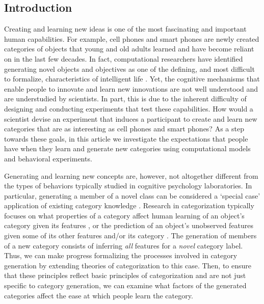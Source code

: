 \documentclass[12pt]{article}
\begin{document}
\begin{flushleft}

\section{Introduction}
\setlength\parindent{0.5in}

Creating and learning new ideas is one of the most fascinating and important
human capabilities. For example, cell phones and smart phones are newly created
categories of objects that young and old adults learned and have become reliant
on in the last few decades. In fact, computational researchers have identified
generating novel objects and objectives as one of the defining, and most
difficult to formalize, characteristics of intelligent life
\citep{lake2017,lehman2011,taylor2016}. Yet, the cognitive mechanisms that
enable people to innovate and learn new innovations are not well understood and
are understudied by scientists. In part, this is due to the inherent difficulty
of designing and conducting experiments that test these capabilities. How would
a scientist devise an experiment that induces a participant to create and learn
new categories that are as interesting as cell phones and smart phones? As a
step towards these goals, in this article we investigate the expectations that
people have when they learn and generate new categories using computational
models and behavioral experiments.

Generating and learning new concepts are, however, not altogether different from
the types of behaviors typically studied in cognitive psychology laboratories.
In particular, generating a member of a novel class can be considered a `special
case' application of existing category knowledge
\citep{kemp2014taxonomy,kurtz2015human}. Research in categorization typically
focuses on what properties of a category affect human learning of an object's
category given its features \citep{shepard1961learning,kurtz2013human}, or the
prediction of an object's unobserved features given some of its other features
and/or its category \citep{markman2003category}. The generation of members of a
new category consists of inferring {\em all} features for a {\em novel} category
label. Thus, we can make progress formalizing the processes involved in category
generation by extending theories of categorization to this case. Then, to ensure
that these principles reflect basic principles of categorization and are not
just specific to category generation, we can examine what factors of the
generated categories affect the ease at which people learn the category.


\end{flushleft}
\end{document}
